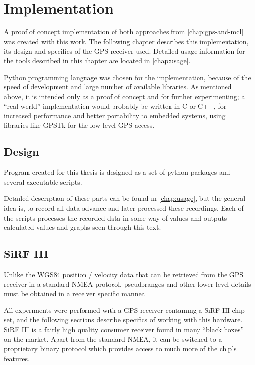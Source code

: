 \chapter{Implementation}
\label{chap:implementation}

A proof of concept implementation of both approaches from \cref{chap:gps-and-mcl}
was created with this work.
The following chapter describes this implementation, its design and
specifics of the GPS receiver used.
Detailed usage information for the tools described in this chapter are located in
\cref{chap:usage}.

Python programming language was chosen for the implementation,
because of the speed of development and large number of available libraries.
As mentioned above, it is intended only as a proof of
concept and for further experimenting; a \enquote{real world} implementation
would probably be written in C or C++, for increased performance and better portability
to embedded systems, using libraries like GPSTk \cite{tolman04} for the low level GPS access.

\section{Design}
Program created for this thesis is designed as a set of python packages and
several executable scripts.

Detailed description of these parts can be found in \cref{chap:usage},
but the general idea is, to record all data advance and later processed these
recordings.
Each of the scripts processes the recorded data in some way of values and
outputs calculated values and graphs seen through this text.

\section{SiRF III}
\label{sec:impl-sirf}

Unlike the WGS84 position / velocity data that can be retrieved from the GPS receiver in a standard
NMEA protocol, pseudoranges and other lower level details must be obtained
in a receiver specific manner.

All experiments were performed with a GPS receiver containing
a SiRF III chip set, and the following sections describe specifics of working with
this hardware.
SiRF III is a fairly high quality consumer receiver found in many
\enquote{black boxes} on the market.
Apart from the standard NMEA, it can be switched to a proprietary binary protocol
which provides access to much more of the chip's features.

